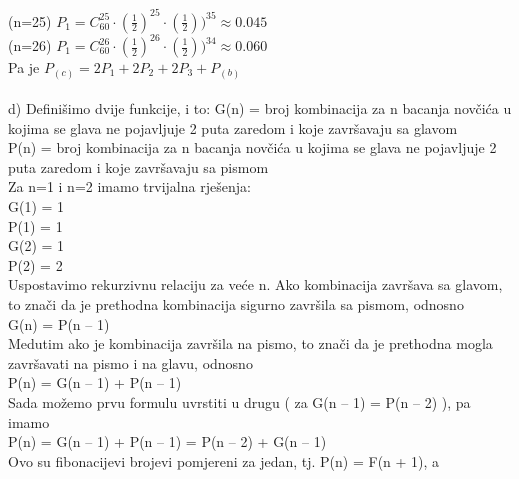 \documentclass[12pt]{article}
\begin{document}
\begin{enumerate}
\begin{center}
{(n=25) $P_1 =  C^{25}_{60} \cdot (\frac{1}{2})^{25} \cdot (\frac{1}{2}))^{35} \approx 0.045 $
\\ \vspace{0.15cm}
(n=26) $P_1 =  C^{26}_{60} \cdot (\frac{1}{2})^{26} \cdot (\frac{1}{2}))^{34} \approx 0.060 $
\\ \vspace{0.15cm}
Pa je $P_{(c)} = 2P_1 + 2P_2 + 2P_3 + P_{(b)}$ \\ \vspace{0.15cm}
\\ \vspace{0.25cm}
d)
Definišimo dvije funkcije, i to:
G(n) = broj kombinacija za n bacanja novčića u kojima se glava ne pojavljuje
2 puta zaredom i koje završavaju sa glavom\\ \vspace{0.25cm}
P(n) = broj kombinacija za n bacanja novčića u kojima se glava ne pojavljuje
2 puta zaredom i koje završavaju sa pismom\\
Za n=1 i n=2 imamo trvijalna rješenja:\\ \vspace{0.15cm}
G(1) = 1\\
P(1) = 1\\
G(2) = 1\\
P(2) = 2\\
\vspace{0.25cm}
Uspostavimo rekurzivnu relaciju za veće n. Ako kombinacija završava
sa glavom, to znači da je prethodna kombinacija sigurno završila sa pismom,
odnosno\\ \vspace{0.15cm}
G(n) = P(n – 1)\\ \vspace{0.15cm}
Medutim ako je kombinacija završila na pismo, to znači da je prethodna
mogla završavati na pismo i na glavu, odnosno\\ \vspace{0.15cm}
P(n) = G(n – 1) + P(n – 1)\\ \vspace{0.15cm}
Sada možemo prvu formulu uvrstiti u drugu ( za G(n – 1) = P(n – 2) ), pa
imamo\\ \vspace{0.15cm}
P(n) = G(n – 1) + P(n – 1) = P(n – 2) + G(n – 1) \\ \vspace{0.25cm}
Ovo su fibonacijevi brojevi pomjereni za jedan, tj. P(n) = F(n + 1), a
}
\end{center}
\end{enumerate}
\end{document}
